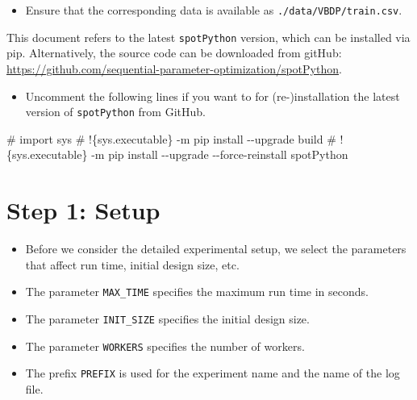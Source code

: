\documentclass[
  letterpaper,
  DIV=11,
  numbers=noendperiod]{scrreprt}
\newenvironment{Shaded}{\begin{snugshade}}{\end{snugshade}}
\newcommand{\CommentTok}[1]{\textcolor[rgb]{0.37,0.37,0.37}{#1}}
\providecommand{\tightlist}{%
  \setlength{\itemsep}{0pt}\setlength{\parskip}{0pt}}\usepackage{longtable,booktabs,array}
\begin{document}
\begin{tcolorbox}[enhanced jigsaw, titlerule=0mm, colbacktitle=quarto-callout-caution-color!10!white, coltitle=black, arc=.35mm, toptitle=1mm, colback=white, left=2mm, opacityback=0, bottomtitle=1mm, bottomrule=.15mm, breakable, opacitybacktitle=0.6, colframe=quarto-callout-caution-color-frame, rightrule=.15mm, toprule=.15mm, leftrule=.75mm, title=\textcolor{quarto-callout-caution-color}{\faFire}\hspace{0.5em}{Caution: Data must be downloaded manually}]

\begin{itemize}
\tightlist
\item
  Ensure that the corresponding data is available as
  \texttt{./data/VBDP/train.csv}.
\end{itemize}

\end{tcolorbox}

This document refers to the latest \texttt{spotPython} version, which
can be installed via pip. Alternatively, the source code can be
downloaded from gitHub:
\url{https://github.com/sequential-parameter-optimization/spotPython}.

\begin{itemize}
\tightlist
\item
  Uncomment the following lines if you want to for (re-)installation the
  latest version of \texttt{spotPython} from GitHub.
\end{itemize}

\begin{Shaded}
\begin{Highlighting}[]
\CommentTok{\# import sys}
\CommentTok{\# !\{sys.executable\} {-}m pip install {-}{-}upgrade build}
\CommentTok{\# !\{sys.executable\} {-}m pip install {-}{-}upgrade {-}{-}force{-}reinstall spotPython}
\end{Highlighting}
\end{Shaded}

\hypertarget{sec-setup-31}{%
\section{Step 1: Setup}\label{sec-setup-31}}

\begin{itemize}
\tightlist
\item
  Before we consider the detailed experimental setup, we select the
  parameters that affect run time, initial design size, etc.
\item
  The parameter \texttt{MAX\_TIME} specifies the maximum run time in
  seconds.
\item
  The parameter \texttt{INIT\_SIZE} specifies the initial design size.
\item
  The parameter \texttt{WORKERS} specifies the number of workers.
\item
  The prefix \texttt{PREFIX} is used for the experiment name and the
  name of the log file.
\end{itemize}
\end{document}
